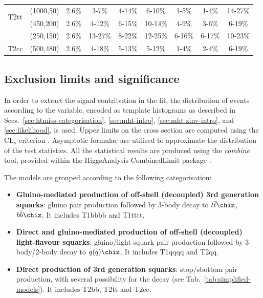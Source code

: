 \begin{table}[h!]
\begin{tabular}{ ccccccccc }
        \hline
        \multirow{2}{*}{T2tt}
            & (1000,50) & 2.6\% & 3-7\%   & 4-14\% & 6-10\%  & 1-5\%  & 1-4\%  & 14-27\% \\
            & (450,200) & 2.6\% & 4-12\%  & 6-15\% & 10-14\% & 4-9\%  & 3-6\%  & 6-19\%  \\
            & (250,150) & 2.6\% & 13-27\% & 8-22\% & 12-25\% & 6-16\% & 6-17\% & 10-23\% \\
        \hline
        \multirow{1}{*}{T2cc}
            & (500,480) & 2.6\% & 4-18\% & 5-13\% & 5-12\% & 1-4\% & 2-4\% & 6-19\% \\
        \hline \hline
    \end{tabular}
\end{table}

\clearpage
\subsection{Exclusion limits and significance}
\label{sec:susy_results}

In order to extract the signal contribution in the fit, the
distribution of events according to the \mht variable, encoded as
template histograms as described in
Secs.~\ref{sec:htmiss-categorisation}, \ref{sec:mht-intro},
\ref{sec:mht-zinv-intro}, and \ref{sec:likelihood}, is used. Upper
limits on the cross section are computed using the $\text{CL}_{s}$
criterion \cite{CLsTechnique}. Asymptotic formulae
\cite{AsymptoticFormulae} are utilised to approximate the distribution
of the test statistics. All the statistical results are produced using
the \textit{combine} tool, provided within the
HiggsAnalysis-CombinedLimit package \cite{Combine}.

The models are grouped according to the following categorisation:
\begin{itemize}
\item \textbf{Gluino-mediated production of off-shell (decoupled) 3rd
    generation squarks}: gluino pair production followed by 3-body
  decay to $t\bar{t}\chiz$,$b\bar{b}\chiz$.  It includes T1bbbb and
  T1tttt.
\item \textbf{Direct and gluino-mediated production of off-shell
    (decoupled) light-flavour squarks}: gluino/light squark pair
  production followed by 3-body/2-body decay to $q(q)\chiz$. It
  includes T1qqqq and T2qq.
\item \textbf{Direct production of 3rd generation squarks}:
  stop/sbottom pair production, with several possibility for the decay
  (see Tab.~\ref{tab:simplified-models}). It includes T2bb, T2tt and
  T2cc.
\end{itemize}

